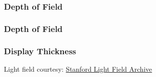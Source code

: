 \documentclass[12pt, compress]{beamer}
\begin{document}
\begin{frame}[fragile]
	\frametitle{Depth of Field}
	
	\begin{figure}
		
	\end{figure}
\end{frame}

\begin{frame}[fragile]
	\frametitle{Depth of Field}
	
	\begin{figure}
		
	\end{figure}
\end{frame}

\begin{frame}[fragile]
	\frametitle{Display Thickness}
	
	\begin{figure}
		\hspace{1cm}
	\end{figure}
	
	{\scriptsize Light field courtesy: \href{http://lightfield.stanford.edu/lfs.html}{Stanford Light Field Archive}}
\end{frame}
\end{document}
